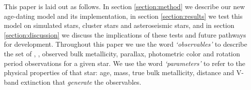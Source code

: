 

This paper is laid out as follows.
In section \ref{section:method} we describe our new age-dating model and its
implementation, in section \ref{section:results} we test this model on
simulated stars, cluster stars and asteroseismic stars, and in section
\ref{section:discussion} we discuss the implications of these tests and future
pathways for development.
Throughout this paper we use the word {\it `observables'} to describe the set
of \teff, \logg, observed bulk metallicity, parallax, photometric color and
rotation period observations for a given star.
We use the word {\it `parameters'} to refer to the physical properties of that
star: age, mass, true bulk metallicity, distance and V-band extinction that
{\it generate} the observables.
